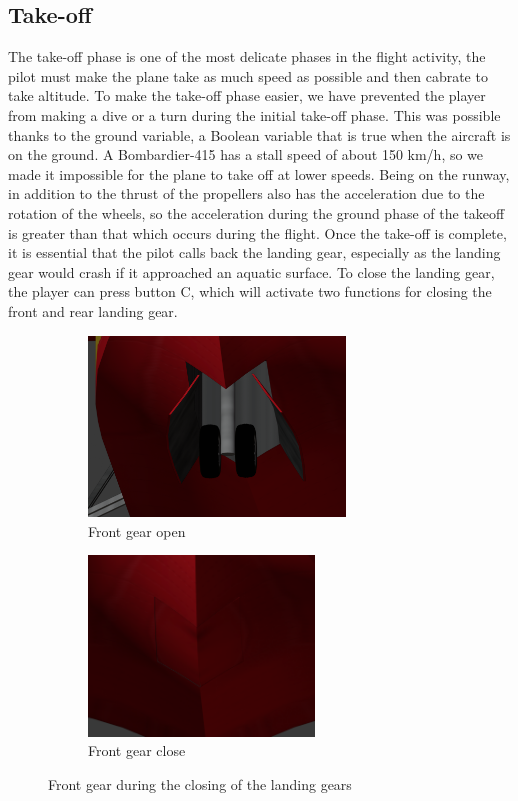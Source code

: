 \documentclass{article}
\begin{document}
\subsection*{Take-off}
The take-off phase is one of the most delicate phases in the flight activity, the pilot must make the plane take as much speed as possible and then cabrate to take altitude. To make the take-off phase easier, we have prevented the player from making a dive or a turn during the initial take-off phase. This was possible thanks to the ground variable, a Boolean variable that is true when the aircraft is on the ground. A Bombardier-415 has a stall speed of about 150 km/h, so we made it impossible for the plane to take off at lower speeds. Being on the runway, in addition to the thrust of the propellers also has the acceleration due to the rotation of the wheels, so the acceleration during the ground phase of the takeoff is greater than that which occurs during the flight. Once the take-off is complete, it is essential that the pilot calls back the landing gear, especially as the landing gear would crash if it approached an aquatic surface. To close the landing gear, the player can press button C, which will activate two functions for closing the front and rear landing gear. 

\begin{figure}[h!]
  \centering
  \begin{subfigure}[b]{0.4\linewidth}
    \includegraphics[height=48mm]{ImmaginiReport/antopen.png}
    \caption{Front gear open}
  \end{subfigure}
  \begin{subfigure}[b]{0.4\linewidth}
    \includegraphics[height=48mm]{ImmaginiReport/antclose.png}
    \caption{Front gear close}
  \end{subfigure}
  \caption{Front gear during the closing of the landing gears}
\end{figure}
\end{document}
